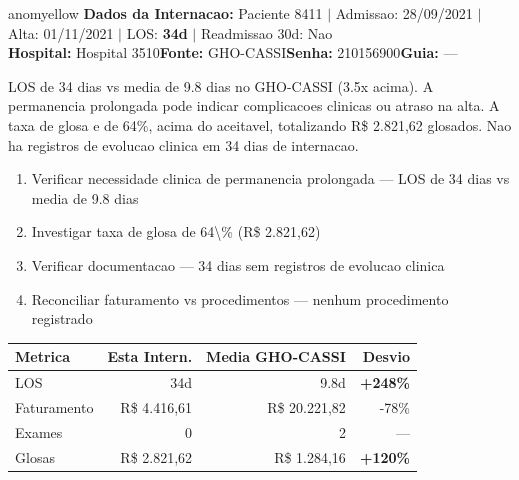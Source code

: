\documentclass[a4paper,10pt]{article}
\begin{document}
\newpage

\begin{anomalycard}[Internacao 10124 | GHO-CASSI | MODERADO (z=2.00)]{anomyellow}
\textbf{Dados da Internacao:} Paciente 8411 $\mid$ Admissao: 28/09/2021 $\mid$ Alta: 01/11/2021 $\mid$ LOS: \textbf{34d} $\mid$ Readmissao 30d: Nao\\
\textbf{Hospital:} Hospital 3510\quad\textbf{Fonte:} GHO-CASSI\quad\textbf{Senha:} 210156900\quad\textbf{Guia:} ---\\
\vspace{2pt}\begin{tcolorbox}[colback=severityred!20,colframe=anomyellow,title={\textbf{Interpretacao de Negocio}},fonttitle=\bfseries\small,left=4pt,right=4pt,top=3pt,bottom=3pt]
{\small LOS de 34 dias vs media de 9.8 dias no GHO-CASSI (3.5x acima). A permanencia prolongada pode indicar complicacoes clinicas ou atraso na alta. A taxa de glosa e de 64\%, acima do aceitavel, totalizando R\$ 2.821,62 glosados. Nao ha registros de evolucao clinica em 34 dias de internacao.}
\end{tcolorbox}
\begin{tcolorbox}[colback=severityyellow!30,colframe=anomorange,title={\textbf{Recomendacoes Especificas}},fonttitle=\bfseries\small,left=4pt,right=4pt,top=3pt,bottom=3pt]
\begin{enumerate}[nosep,leftmargin=16pt]
\item {\small Verificar necessidade clinica de permanencia prolongada --- LOS de 34 dias vs media de 9.8 dias}
\item {\small Investigar taxa de glosa de 64\textbackslash{}\% (R\$ 2.821,62)}
\item {\small Verificar documentacao --- 34 dias sem registros de evolucao clinica}
\item {\small Reconciliar faturamento vs procedimentos --- nenhum procedimento registrado}
\end{enumerate}
\end{tcolorbox}
\begin{center}\begin{tabular}{l r r r}\toprule\textbf{Metrica} & \textbf{Esta Intern.} & \textbf{Media GHO-CASSI} & \textbf{Desvio} \\\midrule
LOS & 34d & 9.8d & \textcolor{anomred}{\textbf{+248\%}} \\
Faturamento & R\$ 4.416,61 & R\$ 20.221,82 & -78\% \\
Exames & 0 & 2 & --- \\
Glosas & R\$ 2.821,62 & R\$ 1.284,16 & \textcolor{anomred}{\textbf{+120\%}} \\
\bottomrule\end{tabular}\end{center}


\end{anomalycard}
\end{document}
